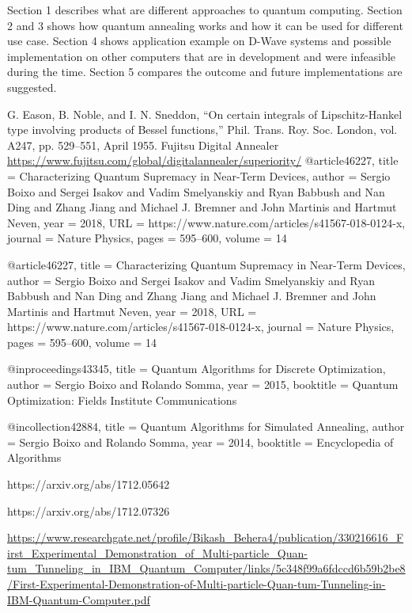 \documentclass[conference]{IEEEtran}
\begin{document}
Section 1 describes what are different approaches to quantum computing. Section 2 and 3 shows how quantum annealing works and how it can be used for different use case. Section 4 shows application example on D-Wave systems and possible implementation on other computers that are in development and were infeasible during the time. Section 5 compares the outcome and future implementations are suggested.

\begin{thebibliography}{00}
 G. Eason, B. Noble, and I. N. Sneddon, ``On certain integrals of Lipschitz-Hankel type involving products of Bessel functions,'' Phil. Trans. Roy. Soc. London, vol. A247, pp. 529--551, April 1955.
 Fujitsu Digital Annealer \url{https://www.fujitsu.com/global/digitalannealer/superiority/}
 @article{46227,
title	= {Characterizing Quantum Supremacy in Near-Term Devices},
author	= {Sergio Boixo and Sergei Isakov and Vadim Smelyanskiy and Ryan Babbush and Nan Ding and Zhang Jiang and Michael J. Bremner and John Martinis and Hartmut Neven},
year	= {2018},
URL	= {https://www.nature.com/articles/s41567-018-0124-x},
journal	= {Nature Physics},
pages	= {595–600},
volume	= {14}
}


 @article{46227,
title	= {Characterizing Quantum Supremacy in Near-Term Devices},
author	= {Sergio Boixo and Sergei Isakov and Vadim Smelyanskiy and Ryan Babbush and Nan Ding and Zhang Jiang and Michael J. Bremner and John Martinis and Hartmut Neven},
year	= {2018},
URL	= {https://www.nature.com/articles/s41567-018-0124-x},
journal	= {Nature Physics},
pages	= {595–600},
volume	= {14}
}


 @inproceedings{43345,
title	= {Quantum Algorithms for Discrete Optimization},
author	= {Sergio Boixo and Rolando Somma},
year	= {2015},
booktitle	= {Quantum Optimization: Fields Institute Communications}
}


 @incollection{42884,
title	= {Quantum Algorithms for Simulated Annealing},
author	= {Sergio Boixo and Rolando Somma},
year	= {2014},
booktitle	= {Encyclopedia of  Algorithms}
}




 https://arxiv.org/abs/1712.05642

 https://arxiv.org/abs/1712.07326

 \url{https://www.researchgate.net/profile/Bikash_Behera4/publication/330216616_First_Experimental_Demonstration_of_Multi-particle_Quan-tum_Tunneling_in_IBM_Quantum_Computer/links/5c348f99a6fdccd6b59b2be8/First-Experimental-Demonstration-of-Multi-particle-Quan-tum-Tunneling-in-IBM-Quantum-Computer.pdf}


\end{thebibliography}
\end{document}
